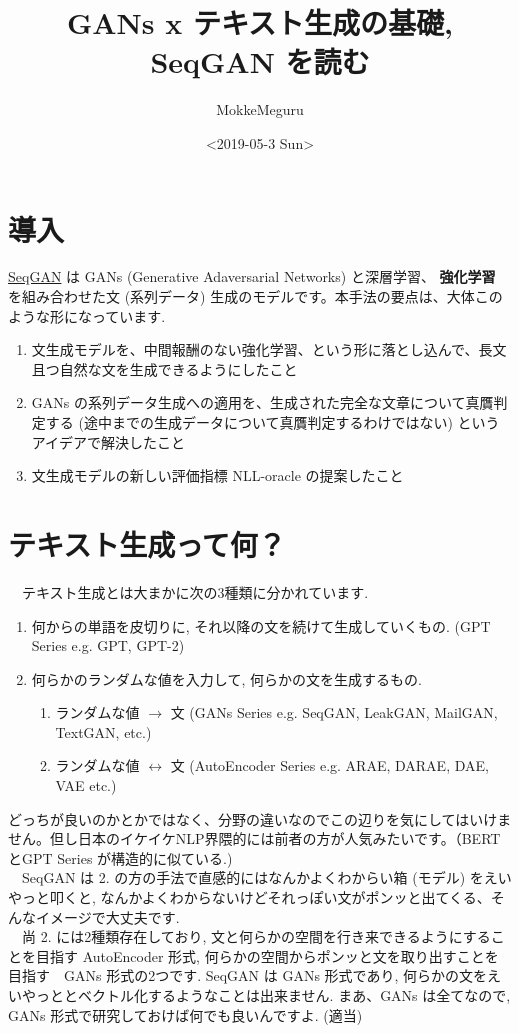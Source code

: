 \documentclass[a4paper, dvipdfmx, 10pt]{article}
\author{MokkeMeguru}
\date{<2019-05-3 Sun>}
\title{GANs x テキスト生成の基礎, SeqGAN を読む}
\begin{document}
\maketitle
\section{導入}
\label{sec:orgf559ce2}
\href{https://arxiv.org/abs/1609.05473}{SeqGAN} は GANs (Generative Adaversarial Networks) と深層学習、 \textbf{強化学習} を組み合わせた文 (系列データ) 生成のモデルです。本手法の要点は、大体このような形になっています.

\begin{enumerate}
\item 文生成モデルを、中間報酬のない強化学習、という形に落とし込んで、長文且つ自然な文を生成できるようにしたこと
\item GANs の系列データ生成への適用を、生成された完全な文章について真贋判定する (途中までの生成データについて真贋判定するわけではない) というアイデアで解決したこと
\item 文生成モデルの新しい評価指標 NLL-oracle の提案したこと
\end{enumerate}

\section{テキスト生成って何？}
\label{sec:org7ab9e6f}
　テキスト生成とは大まかに次の3種類に分かれています.
\begin{enumerate}
\item 何からの単語を皮切りに, それ以降の文を続けて生成していくもの. (GPT Series e.g. GPT, GPT-2)
\item 何らかのランダムな値を入力して, 何らかの文を生成するもの.
\begin{enumerate}
\item ランダムな値 \(\rightarrow\) 文 (GANs Series e.g. SeqGAN, LeakGAN, MailGAN, TextGAN, etc.)
\item ランダムな値 \(\leftrightarrow\) 文 (AutoEncoder Series e.g. ARAE, DARAE, DAE, VAE etc.)
\end{enumerate}
\end{enumerate}

どっちが良いのかとかではなく、分野の違いなのでこの辺りを気にしてはいけません。但し日本のイケイケNLP界隈的には前者の方が人気みたいです。（BERTとGPT Series が構造的に似ている.)\\
　SeqGAN は 2. の方の手法で直感的にはなんかよくわからい箱 (モデル) をえいやっと叩くと, なんかよくわからないけどそれっぽい文がポンッと出てくる、そんなイメージで大丈夫です.\\
　尚 2. には2種類存在しており, 文と何らかの空間を行き来できるようにすることを目指す AutoEncoder 形式, 何らかの空間からポンッと文を取り出すことを目指す　GANs 形式の2つです. SeqGAN は GANs 形式であり, 何らかの文をえいやっととベクトル化するようなことは出来ません. まあ、GANs は全てなので, GANs 形式で研究しておけば何でも良いんですよ. (適当)
\end{document}
